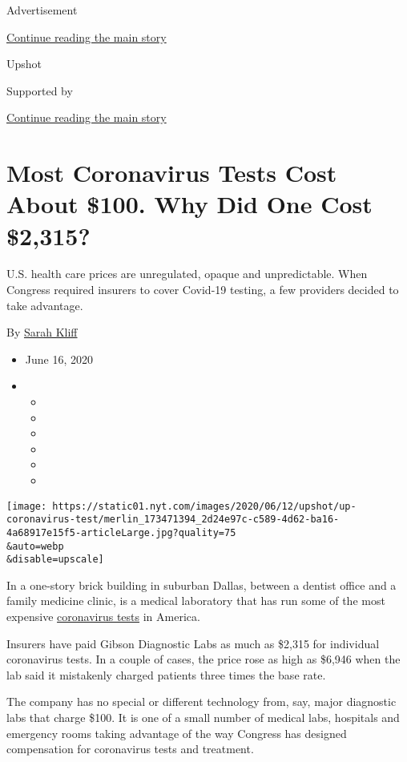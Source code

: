 Advertisement

\protect\hyperlink{after-top}{Continue reading the main story}

Upshot

Supported by

\protect\hyperlink{after-sponsor}{Continue reading the main story}

\hypertarget{most-coronavirus-tests-cost-about-100-why-did-one-cost-2315}{%
\section{Most Coronavirus Tests Cost About \$100. Why Did One Cost
\$2,315?}\label{most-coronavirus-tests-cost-about-100-why-did-one-cost-2315}}

U.S. health care prices are unregulated, opaque and unpredictable. When
Congress required insurers to cover Covid-19 testing, a few providers
decided to take advantage.

By \href{https://www.nytimes.com/by/sarah-kliff}{Sarah Kliff}

\begin{itemize}
\item
  June 16, 2020
\item
  \begin{itemize}
  \item
  \item
  \item
  \item
  \item
  \item
  \end{itemize}
\end{itemize}

\texttt{[image: https://static01.nyt.com/images/2020/06/12/upshot/up-coronavirus-test/merlin\_173471394\_2d24e97c-c589-4d62-ba16-4a68917e15f5-articleLarge.jpg?quality=75\\\&auto=webp\\\&disable=upscale]}

In a one-story brick building in suburban Dallas, between a dentist
office and a family medicine clinic, is a medical laboratory that has
run some of the most expensive
\href{https://www.nytimes.com/2020/06/25/upshot/virus-testing-shortfall-arizona.html}{coronavirus
tests} in America.

Insurers have paid Gibson Diagnostic Labs as much as \$2,315 for
individual coronavirus tests. In a couple of cases, the price rose as
high as \$6,946 when the lab said it mistakenly charged patients three
times the base rate.

The company has no special or different technology from, say, major
diagnostic labs that charge \$100. It is one of a small number of
medical labs, hospitals and emergency rooms taking advantage of the way
Congress has designed compensation for coronavirus tests and treatment.

